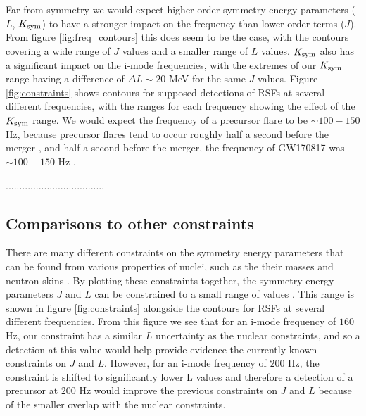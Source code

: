 \documentclass[fleqn,usenatbib]{mnras}
\begin{document}
\iffalse
\hspace{\parindent}Far from symmetry we would expect higher order symmetry energy parameters ($L$, $K_{\rm sym}$) to have a stronger impact on the frequency than lower order terms ($J$). From figure \ref{fig:freq_contours} this does seem to be the case, with the contours covering a wide range of $J$ values and a smaller range of $L$ values. $K_{\rm sym}$ also has a significant impact on the i-mode frequencies, with the extremes of our $K_{\rm sym}$ range having a difference of $\Delta L\sim 20$ MeV for the same $J$ values. Figure \ref{fig:constraints} shows contours for supposed detections of RSFs at several different frequencies, with the ranges for each frequency showing the effect of the $K_{\rm sym}$ range. We would expect the frequency of a precursor flare to be $\sim 100-150$ Hz, because precursor flares tend to occur roughly half a second before the merger \citet{zhong2019precursors}, and half a second before the merger, the frequency of GW170817 was $\sim 100-150$ Hz \citet{abbott2017merger}.

\hspace{\parindent}....................................







\subsection{Comparisons to other constraints}
\hspace{\parindent}There are many different constraints on the symmetry energy parameters that can be found from various properties of nuclei, such as the their masses \citet{kortelainen2010nuclear} and neutron skins \citet{chen2010density}. By plotting these constraints together, the symmetry energy parameters $J$ and $L$ can be constrained to a small range of values \citet{balantekin2014nuclear}. This range is shown in figure \ref{fig:constraints} alongside the contours for RSFs at several different frequencies. From this figure we see that for an i-mode frequency of $160$ Hz, our constraint has a similar $L$ uncertainty as the nuclear constraints, and so a detection at this value would help provide evidence the currently known constraints on $J$ and $L$. However, for an i-mode frequency of $200$ Hz, the constraint is shifted to significantly lower L values and therefore a detection of a precursor at $200$ Hz would improve the previous constraints on $J$ and $L$ because of the smaller overlap with the nuclear constraints. %
\end{document}
